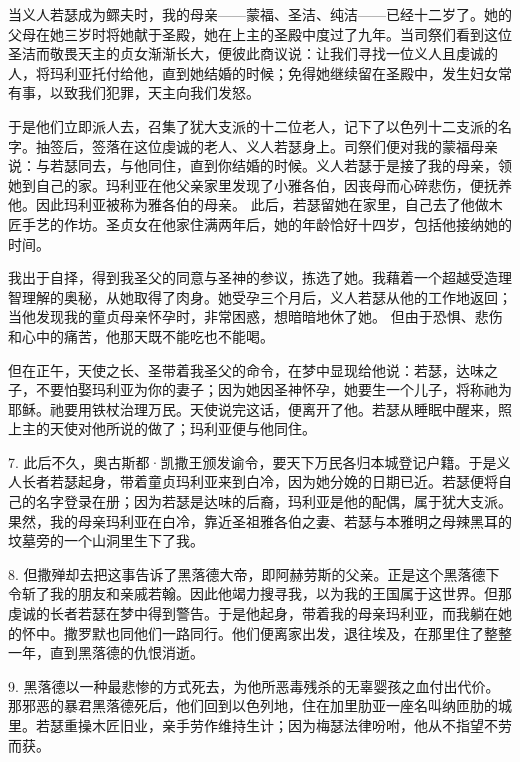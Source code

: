 当义人若瑟成为鳏夫时，我的母亲——蒙福、圣洁、纯洁——已经十二岁了。她的父母在她三岁时将她献于圣殿，她在上主的圣殿中度过了九年。当司祭们看到这位圣洁而敬畏天主的贞女渐渐长大，便彼此商议说：让我们寻找一位义人且虔诚的人，将玛利亚托付给他，直到她结婚的时候；免得她继续留在圣殿中，发生妇女常有事，以致我们犯罪，天主向我们发怒。\par

于是他们立即派人去，召集了犹大支派的十二位老人，记下了以色列十二支派的名字。抽签后，签落在这位虔诚的老人、义人若瑟身上。司祭们便对我的蒙福母亲说：与若瑟同去，与他同住，直到你结婚的时候。义人若瑟于是接了我的母亲，领她到自己的家。玛利亚在他父亲家里发现了小雅各伯，因丧母而心碎悲伤，便抚养他。因此玛利亚被称为雅各伯的母亲。 此后，若瑟留她在家里，自己去了他做木匠手艺的作坊。圣贞女在他家住满两年后，她的年龄恰好十四岁，包括他接纳她的时间。\par

我出于自择，得到我圣父的同意与圣神的参议，拣选了她。我藉着一个超越受造理智理解的奥秘，从她取得了肉身。她受孕三个月后，义人若瑟从他的工作地返回；当他发现我的童贞母亲怀孕时，非常困惑，想暗暗地休了她。 但由于恐惧、悲伤和心中的痛苦，他那天既不能吃也不能喝。\par

但在正午，天使之长、圣带着我圣父的命令，在梦中显现给他说：若瑟，达味之子，不要怕娶玛利亚为你的妻子；因为她因圣神怀孕，她要生一个儿子，将称祂为耶稣。祂要用铁杖治理万民。天使说完这话，便离开了他。若瑟从睡眠中醒来，照上主的天使对他所说的做了；玛利亚便与他同住。\par

7. 此后不久，奥古斯都·凯撒王颁发谕令，要天下万民各归本城登记户籍。于是义人长者若瑟起身，带着童贞玛利亚来到白冷，因为她分娩的日期已近。若瑟便将自己的名字登录在册；因为若瑟是达味的后裔，玛利亚是他的配偶，属于犹大支派。果然，我的母亲玛利亚在白冷，靠近圣祖雅各伯之妻、若瑟与本雅明之母辣黑耳的坟墓旁的一个山洞里生下了我。\par

8. 但撒殚却去把这事告诉了黑落德大帝，即阿赫劳斯的父亲。正是这个黑落德下令斩了我的朋友和亲戚若翰。因此他竭力搜寻我，以为我的王国属于这世界。但那虔诚的长者若瑟在梦中得到警告。于是他起身，带着我的母亲玛利亚，而我躺在她的怀中。撒罗默也同他们一路同行。他们便离家出发，退往埃及，在那里住了整整一年，直到黑落德的仇恨消逝。\par

9. 黑落德以一种最悲惨的方式死去，为他所恶毒残杀的无辜婴孩之血付出代价。那邪恶的暴君黑落德死后，他们回到以色列地，住在加里肋亚一座名叫纳匝肋的城里。若瑟重操木匠旧业，亲手劳作维持生计；因为梅瑟法律吩咐，他从不指望不劳而获。\par

